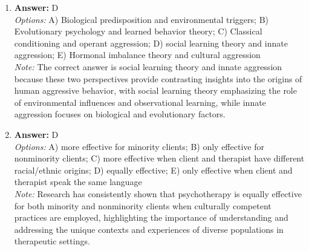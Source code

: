 \documentclass[12pt]{article}
\begin{document}
\begin{enumerate}[label=\arabic*.]
\item \textbf{Answer:} D
\\ \textit{Options:} A) Biological predisposition and environmental triggers; B) Evolutionary psychology and learned behavior theory; C) Classical conditioning and operant aggression; D) social learning theory and innate aggression; E) Hormonal imbalance theory and cultural aggression
\\ \textit{Note:} The correct answer is social learning theory and innate aggression because these two perspectives provide contrasting insights into the origins of human aggressive behavior, with social learning theory emphasizing the role of environmental influences and observational learning, while innate aggression focuses on biological and evolutionary factors.
\item \textbf{Answer:} D
\\ \textit{Options:} A) more effective for minority clients; B) only effective for nonminority clients; C) more effective when client and therapist have different racial/ethnic origins; D) equally effective; E) only effective when client and therapist speak the same language
\\ \textit{Note:} Research has consistently shown that psychotherapy is equally effective for both minority and nonminority clients when culturally competent practices are employed, highlighting the importance of understanding and addressing the unique contexts and experiences of diverse populations in therapeutic settings.
\end{enumerate}
\end{document}
